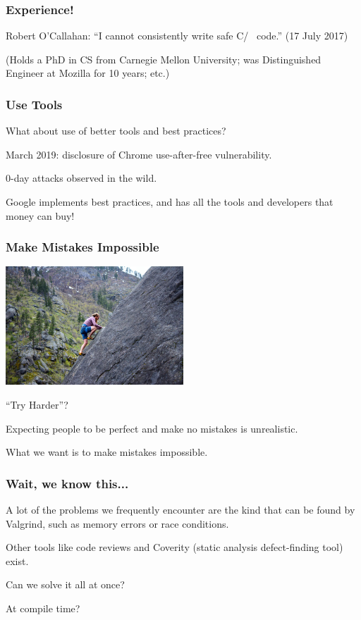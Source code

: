 \begin{frame}
\frametitle{Experience!}

Robert O'Callahan: ``I cannot consistently write safe C/\CPP~ code.'' (17 July 2017) 

(Holds a PhD in CS from Carnegie Mellon University; was Distinguished Engineer at Mozilla for 10 years; etc.)

\end{frame}


\begin{frame}
\frametitle{Use Tools}

What about use of better tools and best practices?

March 2019: disclosure of Chrome use-after-free vulnerability. 

0-day attacks observed in the wild.

Google implements best practices, and has all the tools and developers that
money can buy!

\end{frame}

\begin{frame}
\frametitle{Make Mistakes Impossible}

\begin{center}
	\includegraphics[width=0.5\textwidth]{images/try-harder.jpeg}
\end{center}
``Try Harder''?

 Expecting people to be perfect and make no mistakes is unrealistic.
 
  What we want is to make mistakes impossible.


\end{frame}


\begin{frame}
\frametitle{Wait, we know this...}

A lot of the problems we frequently encounter are the kind that can be found by Valgrind, such as memory errors or race conditions.

Other tools like code reviews and Coverity (static analysis defect-finding tool) exist.

Can we solve it all at once?

At compile time?

\end{frame}



